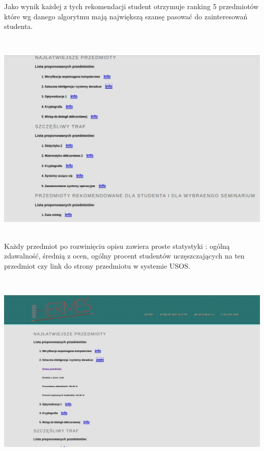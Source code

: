 \documentclass[licencjacka]{pracamgr}
\begin{document}
Jako wynik każdej z tych rekomendacji student otrzymuje ranking 5 przedmiotów które wg danego algorytmu mają największą szansę pasować do zainteresowań studenta. \par
 ~\\
\begin{minipage}{\linewidth} 
	\centering
           \includegraphics[scale=0.5]{rekPrzedmRank.jpg}
\end{minipage} \\ 

Każdy przedmiot po rozwinięciu opisu zawiera proste statystyki : ogólną zdawalność, średnią z ocen, ogólny procent studentów uczęszczających na ten przedmiot czy link do strony przedmiotu w systemie USOS. \par
 ~\\
\begin{minipage}{\linewidth}
	\centering
           \includegraphics[scale=0.5]{rekPrzedmRankDetails.jpg}
\end{minipage} \\ 
\end{document}
